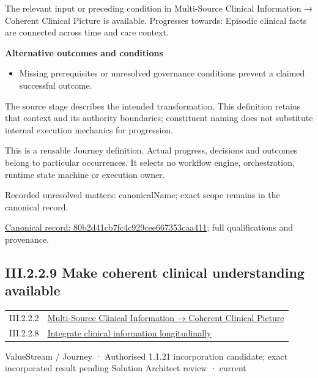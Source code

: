 The relevant input or preceding condition in Multi-Source Clinical Information → Coherent Clinical Picture is available. Progresses towards: Episodic clinical facts are connected across time and care context.



\par\medskip\textbf{Alternative outcomes and conditions}\par


\begin{itemize}


\item Missing prerequisites or unresolved governance conditions prevent a claimed successful outcome.

\end{itemize}


The source stage describes the intended transformation. This definition retains that context and its authority boundaries; constituent naming does not substitute internal execution mechanics for progression.



This is a reusable Journey definition. Actual progress, decisions and outcomes belong to particular occurrences. It selects no workflow engine, orchestration, runtime state machine or execution owner.


{\small Recorded unresolved matters: canonicalName; exact scope remains in the canonical record.}\par
{\footnotesize \href{../../../../../../../continuum/strategy/value-stream/80b2d41cb7fc4c929cee667353caa411.md}{Canonical record: 80b2d41cb7fc4c929cee667353caa411}; full qualifications and provenance.}\par
\subsection*{III.2.2.9 Make coherent clinical understanding available}
\label{navigation:III.2.2.9}

\begin{longtable}{p{.22\linewidth}p{.73\linewidth}}
III.2.2.2 & \hyperref[element:01f655eae3d8485699449c3dcf4f9b56]{Multi-Source Clinical Information → Coherent Clinical Picture} \\
III.2.2.8 & \hyperref[element:80b2d41cb7fc4c929cee667353caa411]{Integrate clinical information longitudinally} \\
\end{longtable}
\label{element:75179fdde77f4c94a47756a7ae109b34}
{\small ValueStream / Journey · Authorised 1.1.21 incorporation candidate; exact incorporated result pending Solution Architect review · current}\par

